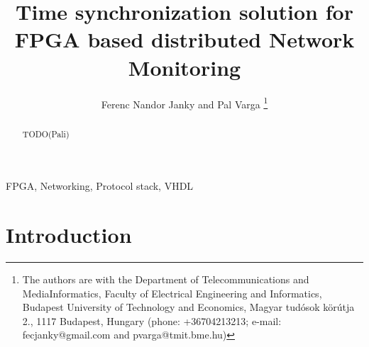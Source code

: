 \documentclass[journal]{IEEEtran}
\begin{document}
%
\title{Time synchronization solution for FPGA based distributed Network Monitoring}%
%
\author{Ferenc Nandor Janky and Pal Varga \thanks{The authors are with the Department of Telecommunications and
 \mbox{MediaInformatics}, Faculty of Electrical Engineering and Informatics,
Budapest University of Technology and Economics,
Magyar tudósok körútja 2., 1117 Budapest, Hungary (phone: +36704213213; e-mail: \mbox{fecjanky@gmail.com} and pvarga@tmit.bme.hu)}}%
%
%
%
\maketitle%
%
\begin{abstract}%
    \boldmath%
    TODO(Pali)%
\end{abstract}%
%
\begin{IEEEkeywords}%
    FPGA, Networking, Protocol stack, VHDL%
\end{IEEEkeywords}%
%
\section{Introduction}\label{sec:Intro}
\end{document}
